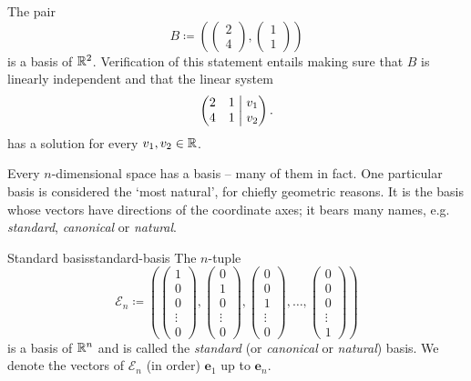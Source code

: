 \begin{example}{}{}
 The pair
 \[
  B \coloneqq \left( 
   \begin{pmatrix}
    2\\
    4
   \end{pmatrix},
   \begin{pmatrix}
    1\\
    1
   \end{pmatrix}
  \right)
 \]
 is a basis of $\mathbb{R}^2$. Verification of this statement entails making sure that
 $B$ is linearly independent and that the linear system
 \[
  \left(
   \begin{matrix*}[r]
    2 & 1 \\
    4 & 1
   \end{matrix*}
   \hspace{1mm}
  \right|
  \left.
   \begin{matrix*}[r]
    v_1\\
    v_2
   \end{matrix*}
  \right).
 \]
 has a solution for every $v_1,v_2 \in \mathbb{R}$.
\end{example}

Every $n$-dimensional space has a basis -- many of them in fact. One particular
basis is considered the `most natural', for chiefly geometric reasons. It is the
basis whose vectors have directions of the coordinate axes; it bears many names,
e.g. \emph{standard}, \emph{canonical} or \emph{natural}.

\begin{definition}{Standard basis}{standard-basis}
 The $n$-tuple
 \[
  \mathcal{E}_n \coloneqq \left( 
   \begin{pmatrix}
    1\\
    0\\
    0\\
    \vdots\\
    0
   \end{pmatrix},
   \begin{pmatrix}
    0\\
    1\\
    0\\
    \vdots\\
    0
   \end{pmatrix},
   \begin{pmatrix}
    0\\
    0\\
    1\\
    \vdots\\
    0
   \end{pmatrix},\ldots,
   \begin{pmatrix}
    0\\
    0\\
    0\\
    \vdots\\
    1
   \end{pmatrix}
  \right)
 \]
 is a basis of $\mathbb{R}^{n}$ and is called the \emph{standard} (or \emph{canonical}
 or \emph{natural}) basis. We denote the vectors of $\mathcal{E}_n$ (in order)
 $\mathbf{e}_1$ up to $\mathbf{e}_n$.
\end{definition}

